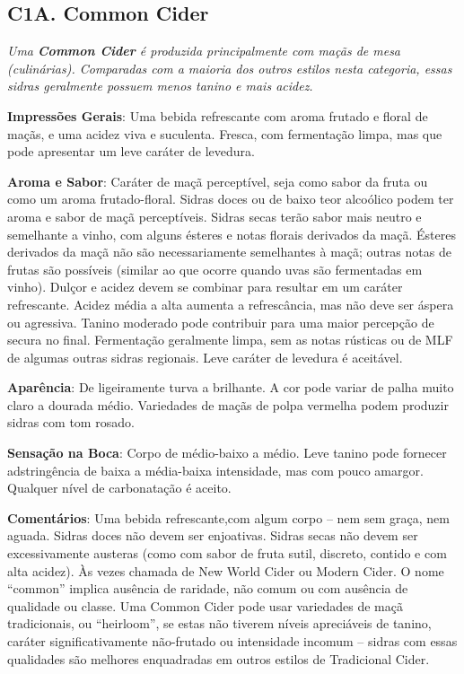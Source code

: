 \subsection*{C1A. Common Cider}

\textit{Uma \textbf{Common Cider} é produzida principalmente com maçãs de mesa (culinárias). Comparadas com a maioria dos outros estilos nesta categoria, essas sidras geralmente possuem menos tanino e mais acidez.}

\textbf{Impressões Gerais}: Uma bebida refrescante com aroma frutado e floral de maçãs, e uma acidez viva e suculenta. Fresca, com fermentação limpa, mas que pode apresentar um leve caráter de levedura.

\textbf{Aroma e Sabor}: Caráter de maçã perceptível, seja como sabor da fruta ou como um aroma frutado-floral. Sidras doces ou de baixo teor alcoólico podem ter aroma e sabor de maçã perceptíveis. Sidras secas terão sabor mais neutro e semelhante a vinho, com alguns ésteres e notas florais derivados da maçã. Ésteres derivados da maçã não são necessariamente semelhantes à maçã; outras notas de frutas são possíveis (similar ao que ocorre quando uvas são fermentadas em vinho). Dulçor e acidez devem se combinar para resultar em um caráter refrescante. Acidez média a alta aumenta a refrescância, mas não deve ser áspera ou agressiva. Tanino moderado pode contribuir para uma maior percepção de secura no final. Fermentação geralmente limpa, sem as notas rústicas ou de MLF de algumas outras sidras regionais. Leve caráter de levedura é aceitável.

\textbf{Aparência}: De ligeiramente turva a brilhante. A cor pode variar de palha muito claro a dourada médio. Variedades de maçãs de polpa vermelha podem produzir sidras com tom rosado.

\textbf{Sensação na Boca}: Corpo de médio-baixo a médio. Leve tanino pode fornecer adstringência de baixa a média-baixa intensidade, mas com pouco amargor. Qualquer nível de carbonatação é aceito.

\textbf{Comentários}: Uma bebida refrescante,com algum corpo – nem sem graça, nem aguada. Sidras doces não devem ser enjoativas. Sidras secas não devem ser excessivamente austeras (como com sabor de fruta sutil, discreto, contido e com alta acidez). Às vezes chamada de New World Cider ou Modern Cider. O nome “common” implica ausência de raridade, não comum ou com ausência de qualidade ou classe. Uma Common Cider pode usar variedades de maçã tradicionais, ou “heirloom”, se estas não tiverem níveis apreciáveis de tanino, caráter significativamente não-frutado ou intensidade incomum – sidras com essas qualidades são melhores enquadradas em outros estilos de Tradicional Cider.

